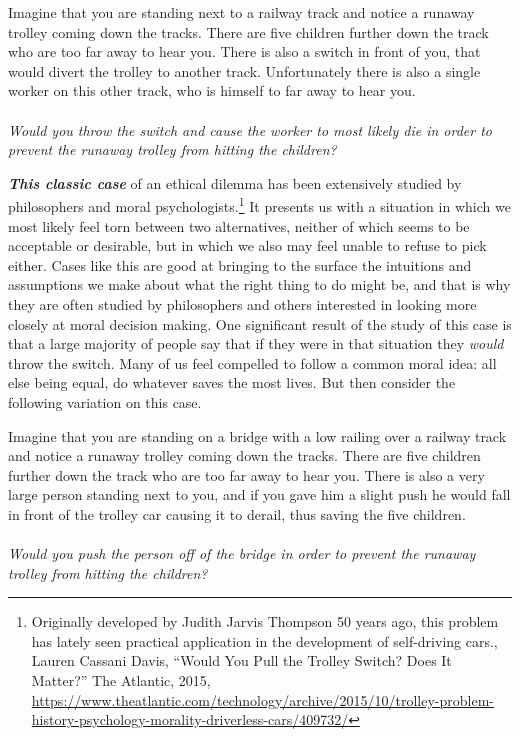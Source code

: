\documentclass[
  12pt, openany]{book}
\makeatletter
\newenvironment{kframe}{%
\medskip{}
\setlength{\fboxsep}{.8em}
 \def\at@end@of@kframe{}%
 \ifinner\ifhmode%
  \def\at@end@of@kframe{\end{minipage}}%
  \begin{minipage}{\columnwidth}%
 \fi\fi%
 \def\FrameCommand##1{\hskip\@totalleftmargin \hskip-\fboxsep
 \colorbox{shadecolor}{##1}\hskip-\fboxsep
     \hskip-\linewidth \hskip-\@totalleftmargin \hskip\columnwidth}%
 \MakeFramed {\advance\hsize-\width
   \@totalleftmargin\z@ \linewidth\hsize
   \@setminipage}}%
 {\par\unskip\endMakeFramed%
 \at@end@of@kframe}
\newenvironment{rmdblock}[1]
  {
  \begin{itemize}
  \renewcommand{\labelitemi}{
    \raisebox{-.7\height}[0pt][0pt]{
      {\setkeys{Gin}{width=3em,keepaspectratio}\texttt{[image: img/\#1]}}
    }
  }
  \setlength{\fboxsep}{1em}
  \begin{kframe}
  \item
  }
  {
  \end{kframe}
  \end{itemize}
  }
\newenvironment{question}
  {\begin{rmdblock}{question}}
  {\end{rmdblock}}
\makeatother
\begin{document}
\begin{question}

Imagine that you are standing next to a railway track and notice a runaway trolley coming down the tracks. There are five children further down the track who are too far away to hear you. There is also a switch in front of you, that would divert the trolley to another track. Unfortunately there is also a single worker on this other track, who is himself to far away to hear you.\\
~\\
\emph{Would you throw the switch and cause the worker to most likely die in order to prevent the runaway trolley from hitting the children?}

\end{question}

\textbf{\emph{This classic case}} of an ethical dilemma has been extensively studied by philosophers and moral psychologists.\footnote{Originally developed by Judith Jarvis Thompson 50 years ago, this problem has lately seen practical application in the development of self-driving cars., Lauren Cassani Davis, ``Would You Pull the Trolley Switch? Does It Matter?'' The Atlantic, 2015, \url{https://www.theatlantic.com/technology/archive/2015/10/trolley-problem-history-psychology-morality-driverless-cars/409732/}} It presents us with a situation in which we most likely feel torn between two alternatives, neither of which seems to be acceptable or desirable, but in which we also may feel unable to refuse to pick either. Cases like this are good at bringing to the surface the intuitions and assumptions we make about what the right thing to do might be, and that is why they are often studied by philosophers and others interested in looking more closely at moral decision making. One significant result of the study of this case is that a large majority of people say that if they were in that situation they \emph{would} throw the switch. Many of us feel compelled to follow a common moral idea: all else being equal, do whatever saves the most lives. But then consider the following variation on this case.

\begin{question}

Imagine that you are standing on a bridge with a low railing over a railway track and notice a runaway trolley coming down the tracks. There are five children further down the track who are too far away to hear you. There is also a very large person standing next to you, and if you gave him a slight push he would fall in front of the trolley car causing it to derail, thus saving the five children.\\
~\\
\emph{Would you push the person off of the bridge in order to prevent the runaway trolley from hitting the children?}

\end{question}
\end{document}
